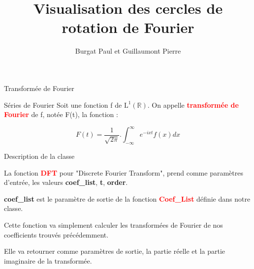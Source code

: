 \documentclass[aspectratio=169]{beamer}
\begin{document}
\begin{frame}{Transformée de Fourier}
    
\begin{block}{Séries de Fourier} 
Soit une fonction f de $\mathrm{L}^{1}(\mathbb{R})$. On appelle  \textcolor{red}{\textbf{transformée de Fourier}} de f, notée F(t), la fonction : 

$$\boxed{F(t) = \frac{1}{\sqrt{2\pi}}.\int^{\infty}_{-\infty} e^{-ixt}f(x)dx}$$

\end{block}
\end{frame}

\begin{frame}{Description de la classe}

La fonction \textcolor{red}{\textbf{DFT}} pour "Discrete Fourier Transform", prend comme paramètres d'entrée, les valeurs \textbf{coef\_list},  \textbf{t}, \textbf{order}.


\vskip 0.3cm
\textbf{coef\_list} est le paramètre de sortie de la fonction \textcolor{red}{\textbf{Coef\_List}} définie dans notre classe. 
\vskip 0.3cm

Cette fonction va simplement calculer les transformées de Fourier de nos coefficients trouvés précédemment. 

\vskip 0.3cm
Elle va retourner comme paramètres de sortie, la partie réelle et la partie imaginaire de la transformée.  

\end{frame}



\author{Burgat Paul et Guillaumont Pierre}

\title[Présentation du Projet de Développement Logiciel]{Visualisation des cercles de rotation de Fourier}

\begin{frame}
    \titlepage
    \vspace{-10pt}
\end{frame}
\end{document}
